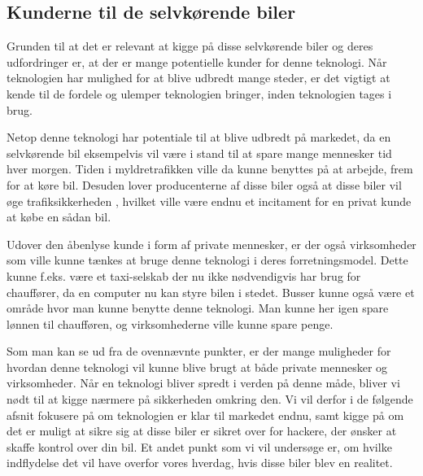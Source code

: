 \subsection{Kunderne til de selvkørende biler}
Grunden til at det er relevant at kigge på disse selvkørende biler og deres udfordringer er, at der er mange potentielle kunder for denne teknologi. Når teknologien har mulighed for at blive udbredt mange steder, er det vigtigt at kende til de fordele og ulemper teknologien bringer, inden teknologien tages i brug.

Netop denne teknologi har potentiale til at blive udbredt på markedet, da en selvkørende bil eksempelvis vil være i stand til at spare mange mennesker tid hver morgen. Tiden i myldretrafikken ville da kunne benyttes på at arbejde, frem for at køre bil. Desuden lover producenterne af disse biler også at disse biler vil øge trafiksikkerheden \cite{GOOG_SITE}, hvilket ville være endnu et incitament for en privat kunde at købe en sådan bil.

Udover den åbenlyse kunde i form af private mennesker, er der også virksomheder som ville kunne tænkes at bruge denne teknologi i deres forretningsmodel. Dette kunne f.eks. være et taxi-selskab der nu ikke nødvendigvis har brug for chauffører, da en computer nu kan styre bilen i stedet. Busser kunne også være et område hvor man kunne benytte denne teknologi. Man kunne her igen spare lønnen til chaufføren, og virksomhederne ville kunne spare penge.

Som man kan se ud fra de ovennævnte punkter, er der mange muligheder for hvordan denne teknologi vil kunne blive brugt at både private mennesker og virksomheder. Når en teknologi bliver spredt i verden på denne måde, bliver vi nødt til at kigge nærmere på sikkerheden omkring den. Vi vil derfor i de følgende afsnit fokusere på om teknologien er klar til markedet endnu, samt kigge på om det er muligt at sikre sig at disse biler er sikret over for hackere, der ønsker at skaffe kontrol over din bil. Et andet punkt som vi vil undersøge er, om hvilke indflydelse det vil have overfor vores hverdag, hvis disse biler blev en realitet. 